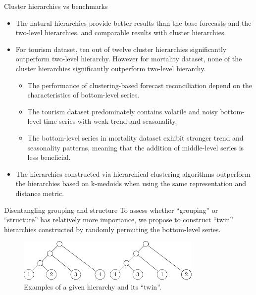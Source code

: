 \documentclass[aspectratio=169]{beamer}
\begin{document}
\begin{frame}{Cluster hierarchies vs benchmarks}

	\begin{itemize}
		\item The {\color{red} natural hierarchies} provide better results than the base forecasts and the two-level hierarchies, and {\color{red} comparable results with cluster hierarchies}.
		\item For tourism dataset, {\color{red} ten out of twelve} cluster hierarchies significantly outperform two-level hierarchy. However for mortality dataset, none of the cluster hierarchies significantly outperform two-level hierarchy.
		\begin{itemize}
			\item The performance of clustering-based forecast reconciliation depend on the characteristics of bottom-level series.
			\item The tourism dataset predominately contains {\color{red} volatile and noisy} bottom-level time series with weak trend and seasonality. 
			\item The bottom-level series in mortality dataset exhibit {\color{red} stronger trend and seasonality patterns}, meaning that the addition of middle-level series is less beneficial.
		\end{itemize}
		\item The hierarchies constructed via {\color{red} hierarchical clustering} algorithms outperform the hierarchies based on {\color{red} k-medoids }when using the same representation and distance metric.
	\end{itemize}
\end{frame}

\begin{frame}{Disentangling grouping and structure}
	To assess whether ``grouping'' or ``structure'' has relatively more importance, we propose to construct {\color{red}``twin'' hierarchies} constructed by {\color{red}randomly permuting the bottom-level series}.

	\begin{figure}
		\centering
		\includegraphics[width=0.8\textwidth]{../manuscript/figures/aggcluster_random.pdf}
		\caption{Examples of a given hierarchy and its “twin”.}
	\end{figure}
\end{frame}
\end{document}
